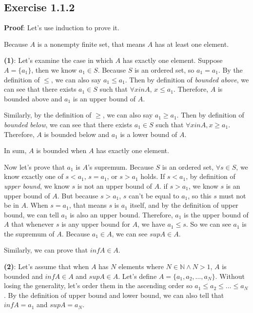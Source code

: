 \documentclass[12pt, letterpaper, oneside]{book}
\begin{document}
\subsection{Exercise 1.1.2}

\textbf{Proof}: Let's use induction to prove it.

Because $A$ is a nonempty finite set, that means $A$ has at least one element.

\textbf{(1)}: Let's examine the case in which $A$ has exactly one element. Suppose $A = \{ a_1 \}$, then we know
$a_1 \in S$. Because $S$ is an ordered set, so $a_1 = a_1$. By the definition of $\le$, we can also say $a_1 \le a_1$.
Then by definition of \textit{bounded above}, we can see that there exists $a_1 \in S$ such that $\forall x in A$,
$x \le a_1$. Therefore, $A$ is bounded above and $a_1$ is an upper bound of $A$.

Similarly, by the definition of $\ge$, we can also say $a_1 \ge a_1$. Then by definition of \textit{bounded below}, we
can see that there exists $a_1 \in S$ such that $\forall x in A, x \ge a_1$. Therefore, $A$ is bounded below and $a_1$
is a lower bound of $A$.

In sum, $A$ is bounded when $A$ has exactly one element.

Now let's prove that $a_1$ is $A$'s supremum. Because $S$ is an ordered set, $\forall s \in S$, we know exactly one of
$s < a_1$, $s = a_1$, or $s > a_1$ holds. If $s < a_1$, by definition of \textit{upper bound}, we know $s$ is not an
upper bound of $A$. if $s > a_1$, we know $s$ is an upper bound of $A$. But because $s > a_1$, $s$ can't be equal to
$a_1$, so this $s$ must not be in $A$. When $s = a_1$, that means $s$ is $a_1$ itself, and by the definition of upper
bound, we can tell $a_1$ is also an upper bound. Therefore, $a_1$ is the upper bound of $A$ that whenever $s$ is any
upper bound for $A$, we have $a_1 \le s$. So we can see $a_1$ is the supremum of $A$. Because $a_1 \in A$, we can see
$sup A \in A$.

Similarly, we can prove that $inf A \in A$.

\textbf{(2)}: Let's assume that when $A$ has $N$ elements where $N \in \mathbb{N} \land N > 1$, $A$ is bounded and
$inf A \in A$ and $sup A \in A$. Let's define $A = \{ a_1, a_2, \ldots, a_N \}$. Without losing the generality, let's
order them in the ascending order so $a_1 \le a_2 \le \ldots \le a_N$. By the definition of upper bound and lower bound,
we can also tell that $inf A = a_1$ and $sup A = a_N$.
\end{document}
